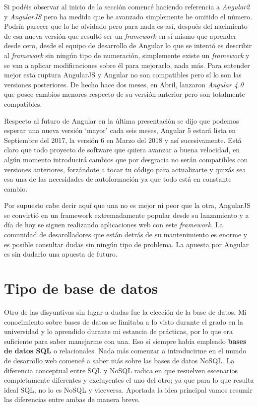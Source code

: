 Si podéis observar al inicio de la sección comencé haciendo referencia a \emph{Angular2} y \emph{AngularJS} pero ha medida que he avanzado simplemente he omitido el número. Podría parecer que lo he olvidado pero para nada es así, después del nacimiento de esa nueva versión que resultó ser un \emph{framework} en sí mismo que aprender desde cero, desde el equipo de desarrollo de Angular lo que se intentó es describir al \emph{framework} sin ningún tipo de numeración, simplemente existe un \emph{framework} y se van a aplicar modificaciones sobre él para mejorarlo, nada más. Para entender mejor esta ruptura AngularJS y Angular no son compatibles pero sí lo son las versiones posteriores. De hecho hace dos meses, en Abril, lanzaron  \emph{Angular  4.0 }  que posee cambios menores respecto de su versión anterior pero son totalmente compatibles.




Respecto al futuro de Angular en la última presentación se dijo  que podemos esperar una nueva versión ‘mayor’ cada seis meses, Angular 5 estará lista en Septiembre del 2017, la versión 6 en Marzo del 2018 y así sucesivamente. Está claro que todo proyecto de software que quiera avanzar a buena velocidad, en algún momento introducirá cambios que por desgracia no serán compatibles con versiones anteriores, forzándote a tocar tu código para actualizarte y quizás sea esa una de las necesidades de autoformación ya que todo está en constante cambio. 

Por supuesto cabe decir aquí que una no es mejor ni peor que la otra, AngularJS se convirtió en un framework extremadamente popular desde su lanzamiento \cite{angularmarket} y a día de hoy se siguen realizando aplicaciones web con este \emph{framework}. La comunidad de desarolladores que están detrás de su mantenimiento es enorme y es posible consultar dudas sin ningún tipo de problema. La apuesta por Angular es sin dudarlo una apuesta de futuro.


  \section{Tipo de base de datos}\label{base de datos}
  
  Otro de las disyuntivas sin lugar a dudas fue la elección de la base de datos. Mi conocimiento sobre bases de datos se limitaba a lo visto durante el grado en la universidad y lo aprendido durante mi estancia de prácticas, por lo que era suficiente para saber manejarme con una. Eso sí siempre había empleado \textbf{bases de datos SQL} o relacionales. Nada más comenzar a introducirme en el mundo de desarrollo web comencé a saber más sobre las bases de datos NoSQL. La diferencia conceptual entre SQL y NoSQL radica en que resuelven escenarios completamente diferentes y excluyentes el uno del otro; ya que para lo que resulta ideal SQL, no lo es NoSQL y viceversa. Aportada la idea principal vamos resumir las diferencias entre ambas de manera breve. 
  
